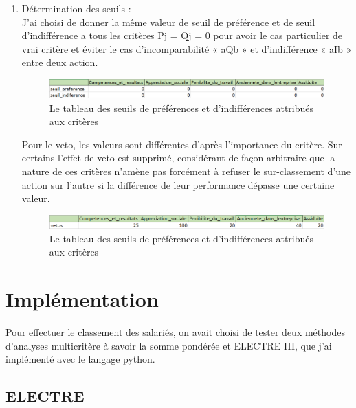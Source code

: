 \begin{enumerate}
\item Détermination des seuils :
\\
J’ai choisi de donner la même valeur de seuil de préférence et de seuil d’indifférence a tous les critères Pj = Qj = 0 pour avoir le cas particulier de vrai critère et éviter le cas d’incomparabilité « aQb » et d’indifférence « aIb » entre deux action.

\begin{figure}[!h]
\begin{center}
\includegraphics[width=16cm]{Conception_implementation/seuils.png}
\end{center}
\caption{Le tableau des seuils de préférences et d’indifférences attribués aux critères}
\end{figure}

Pour le veto, les valeurs sont différentes d’après l’importance du critère. Sur certains l’effet de veto est supprimé, considérant de façon arbitraire que la nature de ces critères n’amène pas forcément à refuser le sur-classement d’une action sur l’autre si la différence de leur performance dépasse une certaine valeur.    

\begin{figure}[!h]
\begin{center}
\includegraphics{Conception_implementation/veto.png}
\end{center}
\caption{Le tableau des seuils de préférences et d’indifférences attribués aux critères}
\end{figure}

\end{enumerate}

\newpage


\section{Implémentation}

 Pour effectuer le classement des salariés, on avait choisi de tester deux méthodes d’analyses multicritère à savoir la somme pondérée et ELECTRE III, que j’ai implémenté avec le langage python.


\subsection{ELECTRE }
